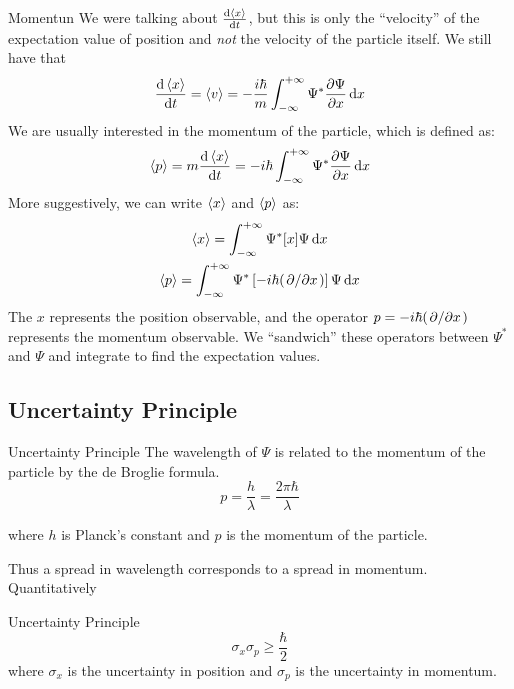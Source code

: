 \begin{frame}{Momentun}
	We were talking about $\dv{\ev x}{t}$, but this is only the ``velocity'' of the expectation value of position and \textit{not} the velocity of the particle itself. We still have that
	\[
		\dv{\ev x}{t} = \ev{v}  = -\frac{i\hbar}{m} \int_{-\infty}^{+\infty} \Psi^* \pdv{\Psi}{x} \dd{x}
	\]
	We are usually interested in the momentum of the particle, which is defined as:
	\begin{equation*}
		\ev p = m \dv{\ev x}{t} = -i\hbar \int_{-\infty}^{+\infty} \Psi^* \pdv{\Psi}{x} \dd{x}
	\end{equation*}
	More suggestively, we can write $\ev x$ and $\ev p$ as:
	\begin{gather*}
		\ev x =  \int_{-\infty}^{+\infty} \Psi^* [x] \Psi \dd{x}\\
		\ev p = \int_{-\infty}^{+\infty} \Psi^* \left[-i\hbar (\pdv*{x}) \right] \Psi \dd{x}
	\end{gather*}
	The $x$ represents the position observable, and the operator $ p = -i\hbar (\pdv*{x})$ represents the momentum observable. We ``sandwich'' these operators between $\Psi^*$ and $\Psi$ and integrate to find the expectation values.
\end{frame}


\subsection{Uncertainty Principle}

\begin{frame}{Uncertainty Principle}
The wavelength of $\Psi$ is related to the momentum of the particle by the de Broglie formula.
$$ p = \frac{h}{\lambda} = \frac{2\pi \hbar}{\lambda}$$

where $h$ is Planck's constant and $p$ is the momentum of the particle.

Thus a spread in wavelength corresponds to a spread in momentum. Quantitatively
\begin{block}{Uncertainty Principle}
	\begin{equation*}
		\sigma_x \sigma_p \ge \frac{\hbar}{2}
	\end{equation*}
	where $\sigma_x$ is the uncertainty in position and $\sigma_p$ is the uncertainty in momentum.
\end{block}

\end{frame}




